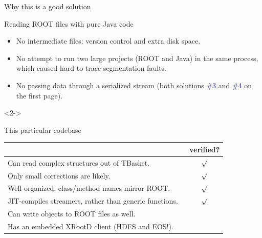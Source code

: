 \documentclass{beamer}
\begin{document}
\begin{frame}{Why this is a good solution}
\vspace{0.3 cm}
\begin{block}{Reading ROOT files with pure Java code}
\begin{itemize}
\item No intermediate files: version control and extra disk space.
\item No attempt to run two large projects (ROOT and Java) in the same process, which caused hard-to-trace segmentation faults.
\item No passing data through a serialized stream (both solutions \textcolor{darkblue}{\#3} and \textcolor{darkblue}{\#4} on the first page).
\end{itemize}
\end{block}

\vspace{-0.5 cm}
\begin{uncoverenv}<2->
\begin{block}{This particular codebase\vspace{-0.5 cm}}
\renewcommand{\arraystretch}{1.2}
\begin{tabular}{p{0.85\linewidth} c}
& verified? \\\hline
Can read complex structures out of TBasket. & $\surd$ \\
Only small corrections are likely. & $\surd$ \\
Well-organized; class/method names mirror ROOT. & $\surd$ \\
JIT-compiles streamers, rather than generic functions. & $\surd$ \\
Can write objects to ROOT files as well. & \\
Has an embedded XRootD client (HDFS and EOS!). & \\
\end{tabular}
\end{block}
\end{uncoverenv}
\end{frame}
\end{document}

